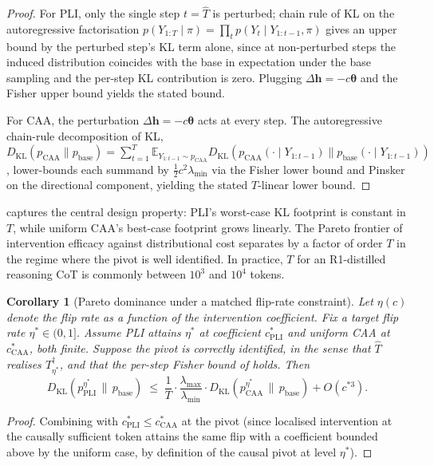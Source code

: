 \documentclass[11pt]{article}
\newtheorem{corollary}[theorem]{Corollary}
\theoremstyle{definition}
\newcommand{\E}{\mathbb{E}}
\newcommand{\1}{\mathbf{1}}
\newcommand{\KL}{D_{\mathrm{KL}}}
\newcommand{\hh}{\bm{h}}
\newcommand{\thetab}{\bm{\theta}}
\begin{document}
\begin{proof}
For PLI, only the single step $t = \widehat{T}$ is perturbed; chain rule of KL on the autoregressive factorisation $p(Y_{1:T} \mid \pi) = \prod_t p(Y_t \mid Y_{1:t-1}, \pi)$ gives an upper bound by the perturbed step's KL term alone, since at non-perturbed steps the induced distribution coincides with the base in expectation under the base sampling and the per-step KL contribution is zero. Plugging $\Delta\hh = -c\thetab$ and the Fisher upper bound yields the stated bound.

For CAA, the perturbation $\Delta\hh = -c\thetab$ acts at every step. The autoregressive chain-rule decomposition of KL, $\KL(p_{\mathrm{CAA}} \| p_{\mathrm{base}}) = \sum_{t=1}^{T} \E_{Y_{1:t-1} \sim p_{\mathrm{CAA}}} \KL(p_{\mathrm{CAA}}(\cdot \mid Y_{1:t-1}) \| p_{\mathrm{base}}(\cdot \mid Y_{1:t-1}))$, lower-bounds each summand by $\tfrac{1}{2} c^2 \lambda_{\min}$ via the Fisher lower bound and Pinsker on the directional component, yielding the stated $T$-linear lower bound.
\end{proof}

 captures the central design property: PLI's worst-case KL footprint is constant in $T$, while uniform CAA's best-case footprint grows linearly. The Pareto frontier of intervention efficacy against distributional cost separates by a factor of order $T$ in the regime where the pivot is well identified. In practice, $T$ for an R1-distilled reasoning CoT is commonly between $10^3$ and $10^4$ tokens.

\begin{corollary}[Pareto dominance under a matched flip-rate constraint]
\label{cor:pareto}
Let $\eta(c)$ denote the flip rate as a function of the intervention coefficient. Fix a target flip rate $\eta^{\ast} \in (0, 1]$. Assume PLI attains $\eta^{\ast}$ at coefficient $c_{\mathrm{PLI}}^{\ast}$ and uniform CAA at $c_{\mathrm{CAA}}^{\ast}$, both finite. Suppose the pivot is correctly identified, in the sense that $\widehat{T}$ realises $T^{\dagger}_{\eta^{\ast}}$, and that the per-step Fisher bound of  holds. Then
\[
\KL(p_{\mathrm{PLI}}^{\eta^{\ast}} \,\|\, p_{\mathrm{base}}) \;\le\; \frac{1}{T} \cdot \frac{\lambda_{\max}}{\lambda_{\min}} \cdot \KL(p_{\mathrm{CAA}}^{\eta^{\ast}} \,\|\, p_{\mathrm{base}}) + O(c^{\ast 3}).
\]
\end{corollary}

\begin{proof}
Combining  with $c_{\mathrm{PLI}}^{\ast} \le c_{\mathrm{CAA}}^{\ast}$ at the pivot (since localised intervention at the causally sufficient token attains the same flip with a coefficient bounded above by the uniform case, by definition of the causal pivot at level $\eta^{\ast}$).
\end{proof}
\end{document}
